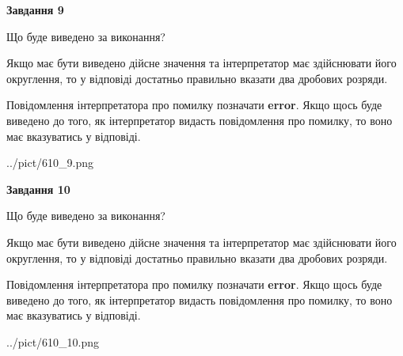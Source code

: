 \documentclass[12pt, ukrainian]{article}
\begin{document}
{\begin {Large}
{\begin {center}\textbf{Завдання 9}\end {center}}\par
Що буде виведено за виконання? \par

Якщо має бути виведено дійсне значення та інтерпретатор має здійснювати його округлення, 
то у відповіді достатньо правильно вказати два дробових розряди.

Повідомлення інтерпретатора про помилку позначати \textbf{error}.
Якщо щось буде виведено до того, як інтерпретатор видасть повідомлення про помилку, 
то воно має вказуватись у відповіді. \par

\begin{center}
	{../pict/610_9.png}
\end{center}
\newpage

{\begin {center}\textbf{Завдання 10}\end {center}}\par
Що буде виведено за виконання? \par

Якщо має бути виведено дійсне значення та інтерпретатор має здійснювати його округлення, 
то у відповіді достатньо правильно вказати два дробових розряди.

Повідомлення інтерпретатора про помилку позначати \textbf{error}.
Якщо щось буде виведено до того, як інтерпретатор видасть повідомлення про помилку, 
то воно має вказуватись у відповіді. \par

\begin{center}
	{../pict/610_10.png}
\end{center}
\newpage

\end {Large}}
\end{document}
